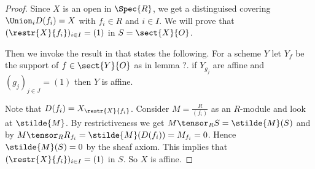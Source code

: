 \begin{proof}
Since $X$ is an open in $\Spec{R}$, 
we get a distinguised covering $\Union_i D(f_i) = X$ with $f_i\in R$
and $i\in I$.
We will prove that $(\restr{X}{f_i})_{i\in I} = (1)$ in $S = \sect{X}{O}$.

Then we invoke the result in  that states the following.
For a scheme $Y$ let $Y_f$  be the support of $f\in \sect{Y}{O}$ as in lemma ?.
if $Y_{g_j}$ are affine and $(g_j)_{j\in J}=(1)$
then $Y$ is affine.

Note that $D(f_i) = X_{\restr{X}{f_i}}$.
Consider $M = \frac{R}{(f_i)}$ as an $R$-module and look at $\stilde{M}$.
By restrictiveness we get $M \tensor_R S = \stilde{M}(S)$ and  
by $M \tensor_R R_{f_i} = \stilde{M}(D(f_i)) = M_{f_i} = 0$. 
Hence $\stilde{M}(S) = 0$ by the sheaf axiom.
This implies that $(\restr{X}{f_i})_{i\in I} = (1)$ in $S$.
So $X$ is affine.
\end{proof}